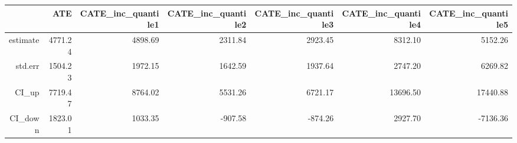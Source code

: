 \begin{table}[ht]
\centering
\begin{tabular}{rrrrrrr}
  \hline
 & ATE & CATE\_inc\_quantile1 & CATE\_inc\_quantile2 & CATE\_inc\_quantile3 & CATE\_inc\_quantile4 & CATE\_inc\_quantile5 \\ 
  \hline
estimate & 4771.24 & 4898.69 & 2311.84 & 2923.45 & 8312.10 & 5152.26 \\ 
  std.err & 1504.23 & 1972.15 & 1642.59 & 1937.64 & 2747.20 & 6269.82 \\ 
  CI\_up & 7719.47 & 8764.02 & 5531.26 & 6721.17 & 13696.50 & 17440.88 \\ 
  CI\_down & 1823.01 & 1033.35 & -907.58 & -874.26 & 2927.70 & -7136.36 \\ 
   \hline
\end{tabular}
\end{table}
